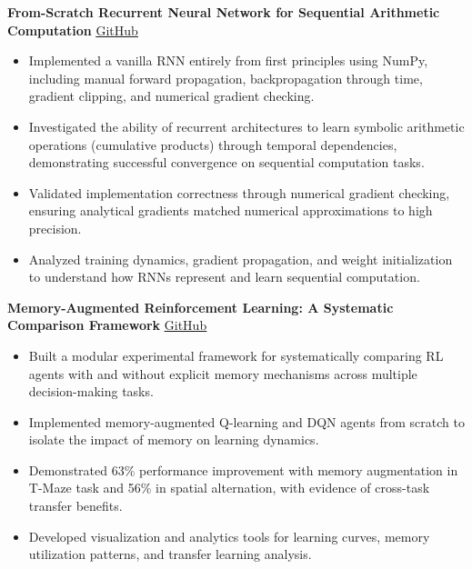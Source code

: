 \documentclass[10.5pt,a4paper]{article}
\begin{document}
\vspace{4pt}

\noindent\textbf{From-Scratch Recurrent Neural Network for Sequential Arithmetic Computation}
\hfill
\href{https://github.com/SaadARazzaq/arithmetic-rnn-from-scratch}{\underline{GitHub}}
\begin{itemize}
    \item Implemented a vanilla RNN entirely from first principles using NumPy, including manual forward propagation, backpropagation through time, gradient clipping, and numerical gradient checking.
    \item Investigated the ability of recurrent architectures to learn symbolic arithmetic operations (cumulative products) through temporal dependencies, demonstrating successful convergence on sequential computation tasks.
    \item Validated implementation correctness through numerical gradient checking, ensuring analytical gradients matched numerical approximations to high precision.
    \item Analyzed training dynamics, gradient propagation, and weight initialization to understand how RNNs represent and learn sequential computation.
\end{itemize}

\vspace{4pt}

\noindent\textbf{Memory-Augmented Reinforcement Learning: A Systematic Comparison Framework}
\hfill
\href{https://github.com/SaadARazzaq/rl-cognitive-task}{\underline{GitHub}}
\begin{itemize}
    \item Built a modular experimental framework for systematically comparing RL agents with and without explicit memory mechanisms across multiple decision-making tasks.
    \item Implemented memory-augmented Q-learning and DQN agents from scratch to isolate the impact of memory on learning dynamics.
    \item Demonstrated 63\% performance improvement with memory augmentation in T-Maze task and 56\% in spatial alternation, with evidence of cross-task transfer benefits.
    \item Developed visualization and analytics tools for learning curves, memory utilization patterns, and transfer learning analysis.
\end{itemize}

\vspace{4pt}
\end{document}
